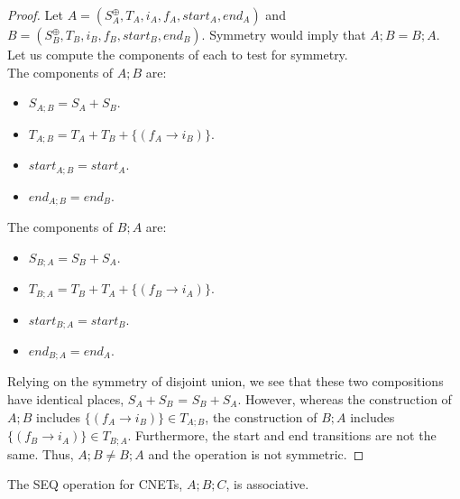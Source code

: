 \begin{proof}
Let $A = (S_A^\oplus, T_A, i_A, f_A, start_A, end_A)$ and $B = (S_B^\oplus, T_B, i_B, f_B, start_B, end_B)$. Symmetry would imply that $A;B = B;A$. Let us compute the components of each to test for symmetry. \\
The components of $A;B$ are: 
\begin{itemize}
 \item $S_{A;B} = S_A + S_B$.
 \item $T_{A;B} = T_A + T_B + \{(f_A \to i_B)\}$.
 \item $start_{A;B} = start_A$.
 \item $end_{A;B} = end_B$.
\end{itemize}
The components of $B;A$ are: 
\begin{itemize}
 \item $S_{B;A} = S_B + S_A$.
 \item $T_{B;A} = T_B + T_A + \{(f_B \to i_A)\}$.
 \item $start_{B;A} = start_B$.
 \item $end_{B;A} = end_A$.
\end{itemize}
Relying on the symmetry of disjoint union, we see that these two compositions have identical places, $S_A + S_B$ = $S_B + S_A$. However, whereas the construction of $A;B$ includes $\{(f_A \to i_B)\} \in T_{A;B}$, the construction of $B;A$ includes $\{(f_B \to i_A)\} \in T_{B;A}.$ Furthermore, the start and end transitions are not the same. Thus, $A;B \neq B;A$ and the operation is not symmetric.
\end{proof}
\begin{lemma}
\label{lemma:SEQ-ASSOC}
The SEQ operation for CNETs, $A;B;C$, is associative.
\end{lemma}
